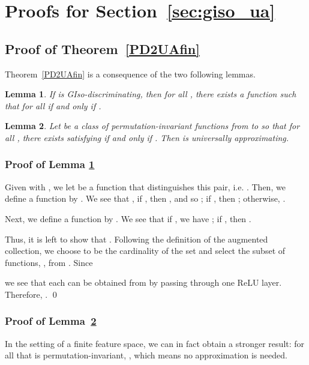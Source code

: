 \documentclass{article}
\newtheorem{lemma}{Lemma}
\begin{document}
\newpage







\newpage
\appendix
\section{Proofs for Section~\ref{sec:giso_ua}}
\label{app.universal}
\subsection{Proof of Theorem~\ref{PD2UAfin}}
\label{app:pf_thm2}
Theorem~\ref{PD2UAfin} is a consequence of the two following lemmas.
\begin{lemma}
\label{lemma1}
    If  is GIso-discriminating, then for all , there exists a function  such that for all  if and only if .
\end{lemma}

\begin{lemma}
\label{lemma2}
Let  be a class of permutation-invariant functions from  to  so that for all , there exists  satisfying  if and only if . 
Then   is universally approximating.
\end{lemma}

\subsubsection{Proof of Lemma \ref{lemma1}}
Given  with , we let  be a function that distinguishes this pair, i.e. . Then, we define a function  by .
We see that , if , then , and so ; if , then ; otherwise, .

Next, we define a function  by . We see that if , we have ; if , then  .

Thus, it is left to show that . Following the definition of the augmented collection, we choose  to be the cardinality of the set  and select the subset of  functions, , from . Since


we see that each  can be obtained from  by passing through one ReLU layer. Therefore, .
\qed

\subsubsection{Proof of Lemma~\ref{lemma2}}
In the setting of a finite feature space, we can in fact obtain a stronger result: for all  that is permutation-invariant, , which means no approximation is needed.
\end{document}
